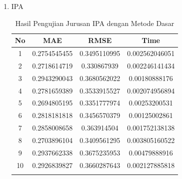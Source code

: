 \begin{enumerate}
    \item IPA
        \begingroup
        \renewcommand\arraystretch{1.5}
            \begin{longtable}[H]{|c|c|c|c|}
                \hline
                No & MAE & RMSE & Time\\
                \hline
                1 & 0.2754545455 & 0.3495110995 & 0.002562046051\\
                \hline
                2 & 0.2718614719 & 0.330867939 & 0.002246141434\\
                \hline
                3 & 0.2943290043 & 0.3680562022 & 0.00180888176\\
                \hline 
                4 & 0.2781659389 & 0.3533915527 & 0.002074956894\\
                \hline 
                5 & 0.2694805195 & 0.3351777974 & 0.00253200531\\
                \hline 
                6 & 0.2818181818 & 0.3456570379 & 0.00125002861\\
                \hline 
                7 & 0.2858008658 & 0.363914504 & 0.001752138138\\
                \hline 
                8 & 0.2703896104 & 0.3409561295 & 0.003805160522\\
                \hline 
                9 & 0.2937662338 & 0.3675235953 & 0.00479888916\\
                \hline 
                10 & 0.2926839827 & 0.3660287643 & 0.002127885818\\
                \hline
                
                \caption{Hasil Pengujian Jurusan IPA dengan Metode Dasar}
                \label{tab:pengujian ipa dasar}
            \end{longtable}
        \endgroup
        

\end{enumerate}
